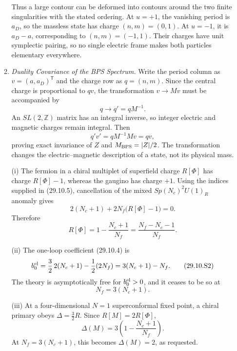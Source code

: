 \begin{enumerate}
\begin{enumerate}
      Thus a large contour can be deformed into contours around the two
      finite singularities with the stated ordering.  At \(u=+1\), the
      vanishing period is \(a_D\), so the massless state has charge
      \((n,m)=(0,1)\).  At \(u=-1\), it is \(a_D-a\), corresponding to
      \((n,m)=(-1,1)\).  Their charges have unit symplectic pairing, so no
      single electric frame makes both particles elementary everywhere.
    \item \emph{Duality Covariance of the BPS Spectrum.}
    Write the period column as \(v=(a,a_D)^{\mathsf T}\) and the charge row
      as \(q=(n,m)\).  Since the central charge is proportional to \(qv\),
      the transformation \(v\to Mv\) must be accompanied by
      \[
        q\longrightarrow q'=qM^{-1}.
      \]
      An \(SL(2,\mathbb Z)\) matrix has an integral inverse, so integer
      electric and magnetic charges remain integral.  Then
      \[
        q'v'=qM^{-1}Mv=qv,
      \]
      proving exact invariance of \(Z\) and
      \(M_{\rm BPS}=\lvert Z\rvert/2\).  The transformation changes the
      electric--magnetic description of a state, not its physical mass.
  \end{enumerate}

  \begin{enumerate}
    \item[(i)]
    The fermion in a chiral multiplet of superfield charge \(R[\Phi]\)
    has charge \(R[\Phi]-1\), whereas the gaugino has charge \(+1\).
    Using the indices supplied in (29.10.5), cancellation of the mixed
    \(Sp(N_c)^2U(1)_R\) anomaly gives
    \[
      2(N_c+1)+2N_f\bigl(R[\Phi]-1\bigr)=0.
    \]
    Therefore
    \[
      \boxed{R[\Phi]=1-\frac{N_c+1}{N_f}
        =\frac{N_f-N_c-1}{N_f}.}
      \tag{29.10.S1}
    \]

    \item[(ii)]
    The one-loop coefficient (29.10.4) is
    \[
      b_0^{\rm el}
       =\frac32\,2(N_c+1)-\frac12(2N_f)
       =3(N_c+1)-N_f.
      \tag{29.10.S2}
    \]
    The theory is asymptotically free for \(b_0^{\rm el}>0\), and it
    ceases to be so at
    \[
      \boxed{N_f=3(N_c+1).}
    \]

    \item[(iii)]
    At a four-dimensional \(N=1\) superconformal fixed point, a chiral
    primary obeys \(\Delta=\tfrac32R\).  Since
    \(R[M]=2R[\Phi]\),
    \[
      \Delta(M)=3\left(1-\frac{N_c+1}{N_f}\right).
      \tag{29.10.S3}
    \]
    At \(N_f=3(N_c+1)\), this becomes
    \(\boxed{\Delta(M)=2}\), as requested.


\end{enumerate}
\end{enumerate}
